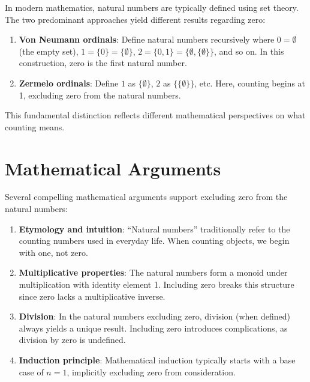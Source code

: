 In modern mathematics, natural numbers are typically defined using set theory. The two predominant approaches yield different results regarding zero:

\begin{enumerate}
\item \textbf{Von Neumann ordinals}: Define natural numbers recursively where $0 = \emptyset$ (the empty set), $1 = \{0\} = \{\emptyset\}$, $2 = \{0,1\} = \{\emptyset,\{\emptyset\}\}$, and so on. In this construction, zero is the first natural number.

\item \textbf{Zermelo ordinals}: Define $1$ as $\{\emptyset\}$, $2$ as $\{\{\emptyset\}\}$, etc. Here, counting begins at 1, excluding zero from the natural numbers.
\end{enumerate}


This fundamental distinction reflects different mathematical perspectives on what counting means.

\section{Mathematical Arguments}

Several compelling mathematical arguments support excluding zero from the natural numbers:

\begin{enumerate}
\item \textbf{Etymology and intuition}: ``Natural numbers'' traditionally refer to the counting numbers used in everyday life. When counting objects, we begin with one, not zero.

\item \textbf{Multiplicative properties}: The natural numbers form a monoid under multiplication with identity element 1. Including zero breaks this structure since zero lacks a multiplicative inverse.

\item \textbf{Division}: In the natural numbers excluding zero, division (when defined) always yields a unique result. Including zero introduces complications, as division by zero is undefined.

\item \textbf{Induction principle}: Mathematical induction typically starts with a base case of $n=1$, implicitly excluding zero from consideration.
\end{enumerate}

